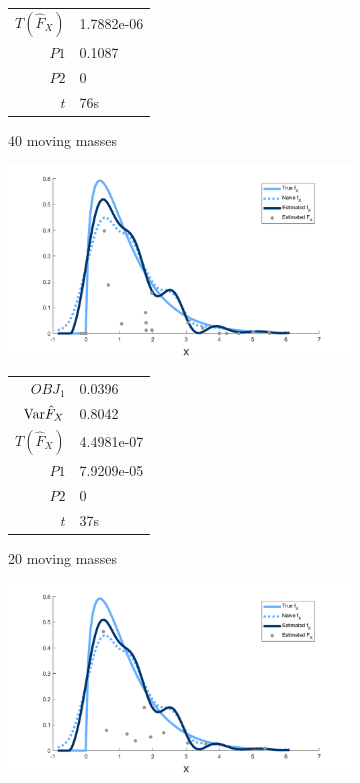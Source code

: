 \begin{figure}
\begin{subfigure}[b]{0.49\textwidth}
\begin{tabular}{r l}
			$T(\hat{F}_X)$ & 1.7882e-06\\
			$P1$ & 0.1087\\
			$P2$ & 0\\
			$t$ & 76s
		\end{tabular}
		\caption{40 moving masses}
		\label{fig:moving masses m40 example}
	\end{subfigure}
	\begin{subfigure}[b]{0.49\textwidth}
		\centering
		\includegraphics[width = \textwidth]{Figures/Deconvolution/moving_masses_m20_example.png}
		\begin{tabular}{r l}
			$OBJ_1$ & 0.0396\\
			$\mathrm{Var} \hat{F}_X$ & 0.8042\\
			$T(\hat{F}_X)$ & 4.4981e-07\\
			$P1$ & 7.9209e-05\\
			$P2$ & 0\\
			$t$ & 37s
		\end{tabular}
		\caption{20 moving masses}
		\label{fig:moving masses m20 example}
	\end{subfigure}
	\hfill
	\begin{subfigure}[b]{0.49\textwidth}
		\centering
		\includegraphics[width = \textwidth]{Figures/Deconvolution/moving_masses_m10_example.png}

\end{subfigure}
\end{figure}
